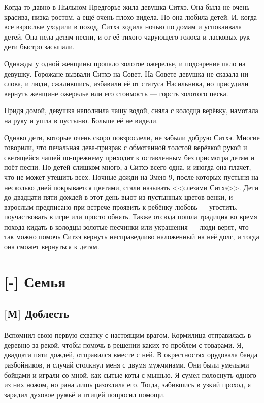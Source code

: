 Когда-то давно в Пыльном Предгорье жила девушка Ситхэ.
Она была не очень красива, низка ростом, а ещё очень плохо видела.
Но она любила детей.
И, когда все взрослые уходили в поход, Ситхэ ходила ночью по домам и успокаивала детей.
Она пела детям песни, и от её тихого чарующего голоса и ласковых рук дети быстро засыпали.

Однажды у одной женщины пропало золотое ожерелье, и подозрение пало на девушку.
Горожане вызвали Ситхэ на Совет.
На Совете девушка не сказала ни слова, и люди, сжалившись, избавили её от статуса Насильника, но присудили вернуть женщине ожерелье или его стоимость --- горсть золотого песка.

Придя домой, девушка наполнила чашу водой, сняла с колодца верёвку, намотала на руку и ушла в пустыню.
Больше её не видели.

Однако дети, которые очень скоро повзрослели, не забыли добрую Ситхэ.
Многие говорили, что печальная дева-призрак с обмотанной толстой верёвкой рукой и светящейся чашей по-прежнему приходит к оставленным без присмотра детям и поёт песни.
Но детей слишком много, а Ситхэ всего одна, и иногда она плачет, что не может утешить всех.
Ночные дожди на Змею 9, после которых пустыня на несколько дней покрывается цветами, стали называть <<слезами Ситхэ>>.
Дети до двадцати пяти дождей в этот день вьют из пустынных цветов венки, и взрослым предписано при встрече проявить к ребёнку любовь --- угостить, поучаствовать в игре или просто обнять.
Также отсюда пошла традиция во время похода кидать в колодцы золотые песчинки или украшения --- люди верят, что так можно помочь Ситхэ вернуть несправедливо наложенный на неё долг, и тогда она сможет вернуться к детям.

\chapter{[-] Семья}

\section{[М] Доблесть}

\textspace

Вспомнил свою первую схватку с настоящим врагом.
Кормилица отправилась в деревню за рекой, чтобы помочь в решении каких-то проблем с товарами.
Я, двадцати пяти дождей, отправился вместе с ней.
В окрестностях орудовала банда разбойников, и случай столкнул меня с двумя мужчинами.
Они были умелыми бойцами и играли со мной, как сытые коты с мышью.
Я сумел полоснуть одного из них ножом, но рана лишь разозлила его.
Тогда, забившись в узкий проход, я зарядил духовое ружьё и птицей попросил помощи.

